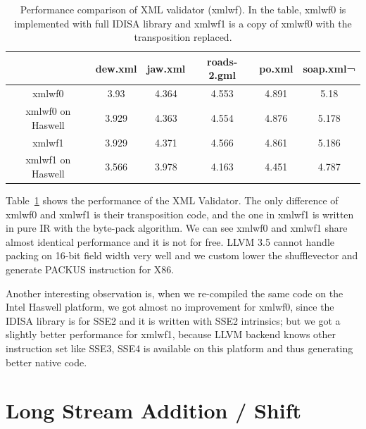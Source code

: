 \begin{table}[h]
\centering
\begin{tabular}{|c|c|c|c|c|c|}
\hline
        & dew.xml  &  jaw.xml  &  roads-2.gml  &  po.xml  & soap.xml¬ \\\hline
xmlwf0   &  3.93   &    4.364   &   4.553   &   4.891   &   5.18 \\ \hline
xmlwf0 on Haswell   &  3.929   &   4.363   &   4.554   &   4.876   &   5.178 \\ \hline

xmlwf1   &  3.929   &   4.371   &   4.566   &   4.861   &   5.186 \\ \hline
xmlwf1 on Haswell &   3.566   &   3.978   &   4.163   &   4.451   &   4.787 \\ \hline
\end{tabular}
\caption[Performance Comparison of XML Validator (xmlwf)]{Performance comparison of XML validator (xmlwf). In the table, xmlwf0 is implemented with full IDISA library and xmlwf1 is a copy of xmlwf0 with the transposition replaced.}
\label{table:xmlwf_perf}
\end{table}

Table~\ref{table:xmlwf_perf} shows the performance of the XML Validator. The only difference of xmlwf0 and xmlwf1 is their transposition code, and the one in xmlwf1 is written in pure IR with the byte-pack algorithm. We can see xmlwf0 and xmlwf1 share almost identical performance and it is not for free. LLVM 3.5 cannot handle packing on 16-bit field width very well and we custom lower the shufflevector and generate PACKUS instruction for X86.

Another interesting observation is, when we re-compiled the same code on the Intel Haswell platform, we got almost no improvement for xmlwf0, since the IDISA library is for SSE2 and it is written with SSE2 intrinsics; but we got a slightly better performance for xmlwf1, because LLVM backend knows other instruction set like SSE3, SSE4 is available on this platform and thus generating better native code.

\section{Long Stream Addition / Shift}

